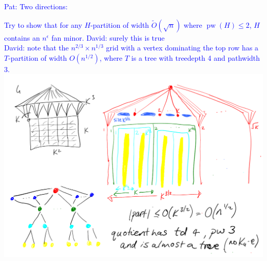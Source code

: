 \documentclass{patmorin}
\renewcommand{\le}{\leqslant}
\newcommand{\david}[1]{{\color{orange} David: #1}}
\newcommand{\pat}[1]{\textcolor{Blue}{Pat: #1}}
\DeclareMathOperator{\pw}{pw}
\begin{document}
\pat{Two directions:
\begin{compactenum}
    \item Try to show that for any $H$-partition of width $\tilde{O}(\sqrt{n})$ where $\pw(H)\le 2$, $H$ contains an $n^{\epsilon}$ fan minor. \david{surely this is true}\\[2ex]
   \david{note that the $n^{2/3}\times n^{1/3}$ grid with a vertex dominating the top row has a $T$-partition of width $O(n^{1/2})$, where $T$ is a tree with treedepth 4 and pathwidth 3.\\
   \includegraphics[page=2,width=\textwidth]{sqrtnTreePartitions.pdf}
}
\end{compactenum}}
\end{document}
